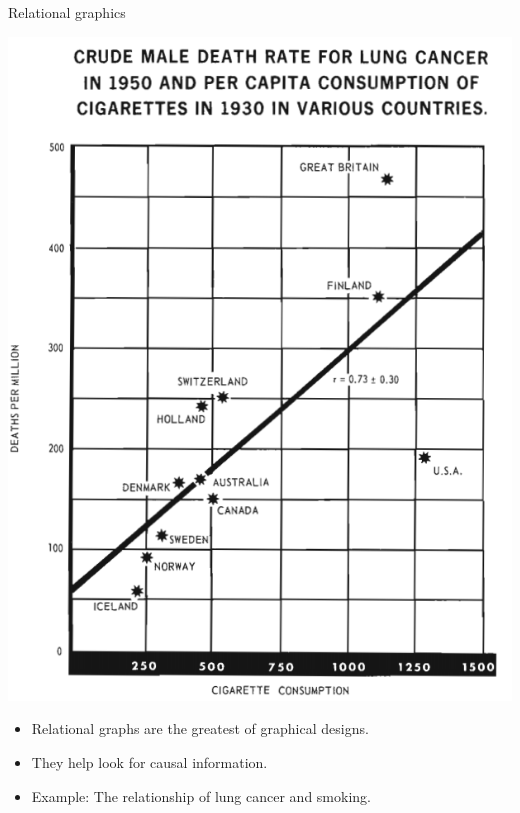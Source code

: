 \documentclass[
  ignorenonframetext,
]{beamer}
\begin{document}
\begin{frame}{Relational graphics}
\protect\hypertarget{relational-graphics-2}{}
\begin{minipage}{0.45\textwidth}
\centering
\includegraphics[width=\textwidth]{excellence_figs/fig_25.png}
\end{minipage}
\hfill
\begin{minipage}{0.5\textwidth}
\footnotesize
\begin{itemize}
  \item Relational graphs are the greatest of graphical designs.
  \item They help look for causal information.
  \item Example: The relationship of lung cancer and smoking.
\end{itemize}
\end{minipage}
\end{frame}
\end{document}
